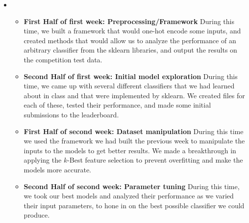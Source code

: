 \begin{itemize}
\begin{itemize}
    \end{itemize}

    \item {}
    \begin{itemize}
    \item \textbf{First Half of first week: Preprocessing/Framework} During this time, we built a framework that would one-hot encode some inputs, and created methods that would allow us to analyze the performance of an arbitrary classifier from the sklearn libraries, and output the results on the competition test data.
    \item \textbf{Second Half of first week: Initial model exploration} During this time, we came up with several different classifiers that we had learned about in class and that were implemented by sklearn. We created files for each of these, tested their performance, and made some initial submissions to the leaderboard.
    \item \textbf{First Half of second week: Dataset manipulation} During this time we used the framework we had built the previous week to manipulate the inputs to the models to get better results. We made a breakthrough in applying the $k$-Best feature selection to prevent overfitting and make the models more accurate.
    \item \textbf{Second Half of second week: Parameter tuning} During this time, we took our best models and analyzed their performance as we varied their input parameters, to hone in on the best possible classifier we could produce.
    \end{itemize}

\end{itemize}



